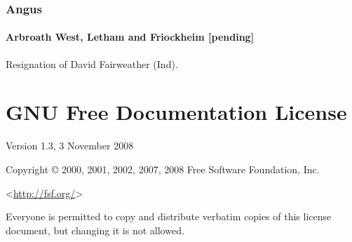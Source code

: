 \documentclass[a4paper,openany]{book}
\begin{document}
\begin{resultsiii}
\subsection*{Angus}

\subsubsection*{Arbroath West, Letham and Friockheim \hspace*{\fill}\nolinebreak[1]%
	\enspace\hspace*{\fill}
	[pending]}


Resignation of David Fairweather (Ind).

\end{resultsiii}

\clearpage
{}
{\scriptsize%
\frenchspacing\printindex}
\thispagestyle{plain}

\chapter*{{GNU Free Documentation License}}
\pagestyle{plain}

 Version 1.3, 3 November 2008


 Copyright \copyright{} 2000, 2001, 2002, 2007, 2008 Free Software Foundation, Inc.

 \bigskip

 <\url{http://fsf.org/}>

 \bigskip

 Everyone is permitted to copy and distribute verbatim copies
 of this license document, but changing it is not allowed.
\end{document}
